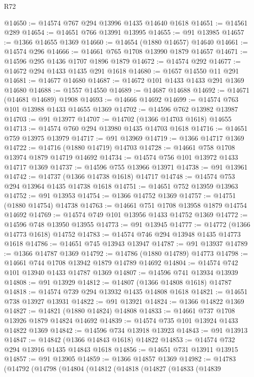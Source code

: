 \begin{lexlean}{R72}
\begin{coremodule}
@14650 := @14574 @767 @294 @13996 @1435 @14640 @1618
@14651 := @14561 @289
@14654 := @14651 @766 @13991 @13995
@14655 := @91 @13985
@14657 := @1366 @14655 @1369
@14660 := @14654 (@1880 @14657) @14640
@14661 := @14574 @296
@14666 := @14661 @765 @1708 @13990 @1879 @14657
@14671 := @14596 @295 @1436 @1707 @1896 @1879
@14672 := @14574 @292
@14677 := @14672 @294 @1433 @1435 @291 @1618
@14680 := @1657 @14550 @11 @291
@14681 := @14677 @14680
@14687 := @14672 @101 @1433 @1433 @291 @1369 @14680
@14688 := @1557 @14550
@14689 := @14687 @14688
@14692 := @14671 (@14681 @14689) @1908
@14693 := @14666 @14692
@14699 := @14574 @763 @101 @13988 @1433 @14655 @1369
@14702 := @14596 @762 @13982 @13987
@14703 := @91 @13977
@14707 := @14702 (@1366 @14703 @1618) @14655
@14713 := @14574 @760 @294 @13980 @1435 @14703 @1618
@14716 := @14651 @759 @13975 @13979
@14717 := @91 @13969
@14719 := @1366 @14717 @1369
@14722 := @14716 (@1880 @14719) @14703
@14728 := @14661 @758 @1708 @13974 @1879 @14719 @14692
@14734 := @14574 @756 @101 @13972 @1433 @14717 @1369
@14737 := @14596 @755 @13966 @13971
@14738 := @91 @13961
@14742 := @14737 (@1366 @14738 @1618) @14717
@14748 := @14574 @753 @294 @13964 @1435 @14738 @1618
@14751 := @14651 @752 @13959 @13963
@14752 := @91 @13953
@14754 := @1366 @14752 @1369
@14757 := @14751 (@1880 @14754) @14738
@14763 := @14661 @751 @1708 @13958 @1879 @14754 @14692
@14769 := @14574 @749 @101 @13956 @1433 @14752 @1369
@14772 := @14596 @748 @13950 @13955
@14773 := @91 @13945
@14777 := @14772 (@1366 @14773 @1618) @14752
@14783 := @14574 @746 @294 @13948 @1435 @14773 @1618
@14786 := @14651 @745 @13943 @13947
@14787 := @91 @13937
@14789 := @1366 @14787 @1369
@14792 := @14786 (@1880 @14789) @14773
@14798 := @14661 @744 @1708 @13942 @1879 @14789 @14692
@14804 := @14574 @742 @101 @13940 @1433 @14787 @1369
@14807 := @14596 @741 @13934 @13939
@14808 := @91 @13929
@14812 := @14807 (@1366 @14808 @1618) @14787
@14818 := @14574 @739 @294 @13932 @1435 @14808 @1618
@14821 := @14651 @738 @13927 @13931
@14822 := @91 @13921
@14824 := @1366 @14822 @1369
@14827 := @14821 (@1880 @14824) @14808
@14833 := @14661 @737 @1708 @13926 @1879 @14824 @14692
@14839 := @14574 @735 @101 @13924 @1433 @14822 @1369
@14842 := @14596 @734 @13918 @13923
@14843 := @91 @13913
@14847 := @14842 (@1366 @14843 @1618) @14822
@14853 := @14574 @732 @294 @13916 @1435 @14843 @1618
@14856 := @14651 @731 @13911 @13915
@14857 := @91 @13905
@14859 := @1366 @14857 @1369
@14982 := @14783
    (@14792
      (@14798
        (@14804
          (@14812
            (@14818
              (@14827
                (@14833
                  (@14839

\end{coremodule}
\end{lexlean}
